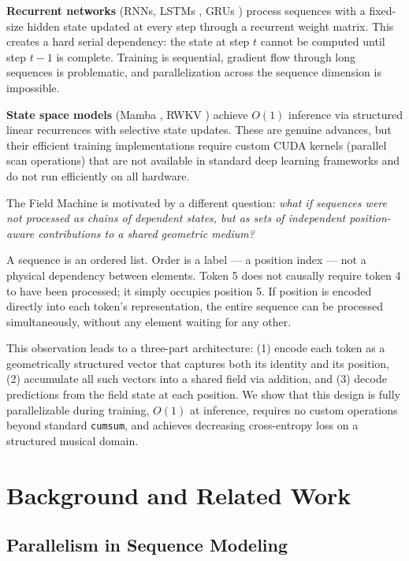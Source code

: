 \documentclass[11pt]{article}
\begin{document}
\textbf{Recurrent networks} (RNNs, LSTMs \cite{hochreiter1997long}, GRUs \cite{cho2014learning}) process sequences with a fixed-size hidden state updated at every step through a recurrent weight matrix. This creates a hard serial dependency: the state at step $t$ cannot be computed until step $t-1$ is complete. Training is sequential, gradient flow through long sequences is problematic, and parallelization across the sequence dimension is impossible.

\textbf{State space models} (Mamba \cite{gu2023mamba}, RWKV \cite{peng2023rwkv}) achieve $O(1)$ inference via structured linear recurrences with selective state updates. These are genuine advances, but their efficient training implementations require custom CUDA kernels (parallel scan operations) that are not available in standard deep learning frameworks and do not run efficiently on all hardware.

The Field Machine is motivated by a different question: \textit{what if sequences were not processed as chains of dependent states, but as sets of independent position-aware contributions to a shared geometric medium?}

A sequence is an ordered list. Order is a label — a position index — not a physical dependency between elements. Token 5 does not causally require token 4 to have been processed; it simply occupies position 5. If position is encoded directly into each token's representation, the entire sequence can be processed simultaneously, without any element waiting for any other.

This observation leads to a three-part architecture: (1) encode each token as a geometrically structured vector that captures both its identity and its position, (2) accumulate all such vectors into a shared field via addition, and (3) decode predictions from the field state at each position. We show that this design is fully parallelizable during training, $O(1)$ at inference, requires no custom operations beyond standard \texttt{cumsum}, and achieves decreasing cross-entropy loss on a structured musical domain.

\section{Background and Related Work}

\subsection{Parallelism in Sequence Modeling}
\end{document}
